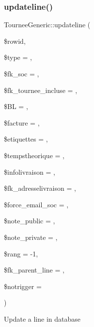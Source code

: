 \subsubsection{\texorpdfstring{updateline()}{updateline()}}
{\footnotesize\ttfamily Tournee\+Generic\+::updateline (\begin{DoxyParamCaption}\item[{}]{\$rowid,  }\item[{}]{\$type = {},  }\item[{}]{\$fk\+\_\+soc = {},  }\item[{}]{\$fk\+\_\+tournee\+\_\+incluse = {},  }\item[{}]{\$\+BL = {},  }\item[{}]{\$facture = {},  }\item[{}]{\$etiquettes = {},  }\item[{}]{\$tempstheorique = {},  }\item[{}]{\$infolivraison = {\ttfamily \textquotesingle{}\textquotesingle{}},  }\item[{}]{\$fk\+\_\+adresselivraison = {},  }\item[{}]{\$force\+\_\+email\+\_\+soc = {},  }\item[{}]{\$note\+\_\+public = {\ttfamily \textquotesingle{}\textquotesingle{}},  }\item[{}]{\$note\+\_\+private = {\ttfamily \textquotesingle{}\textquotesingle{}},  }\item[{}]{\$rang = {\ttfamily -\/1},  }\item[{}]{\$fk\+\_\+parent\+\_\+line = {},  }\item[{}]{\$notrigger = {} }\end{DoxyParamCaption})}

Update a line in database


